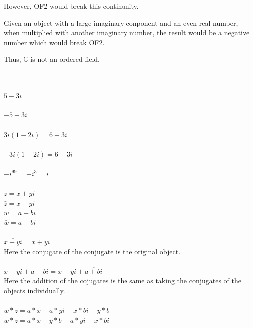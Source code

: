 \documentclass[12pt]{article}
\begin{document}
However, OF2 would break this continunity. 

Given an object with a large imaginary conponent and an even real number, when multiplied with another imaginary number, the result would be a negative number which would break OF2. 

Thus, $\mathbb{C}$ is not an ordered field.

\\

\\
$5 - 3i$\\

\\
$-5 + 3i$\\

\\
$3i(1-2i) = 6+3i$\\

\\
$-3i(1+2i) = 6-3i$\\

\\
$-i^{99} = -i^3 = i$\\

\\

$z = x + yi$\\
$\bar{z} = x - yi$\\
$w = a + bi$\\
$\bar{w} = a - bi$\\


\\

$\overline{x-yi} = x + yi$\\
Here the conjugate of the conjugate is the original object.\\

\\
$x-yi+a-bi = \overline{x+yi} + \overline{a+bi}$\\
Here the addition of the cojugates is the same as taking the conjugates of the objects individually.\\

\\
$w*z = a*x + a*yi + x*bi - y*b$ \\


$\overline{w*z} = a*x - y*b - a*yi - x*bi$\\
\end{document}
